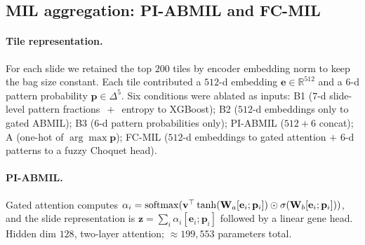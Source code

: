\subsection*{MIL aggregation: PI-ABMIL and FC-MIL}

\paragraph{Tile representation.}
For each slide we retained the top $200$ tiles by encoder
embedding norm to keep the bag size constant.
Each tile contributed a $512$-d \ctranspath{} embedding
$\mathbf{e}\in\mathbb{R}^{512}$ and a $6$-d pattern probability
$\mathbf{p}\in\Delta^5$.
Six conditions were ablated as inputs:
B1 ($7$-d slide-level pattern fractions $\,+\,$ entropy
to XGBoost\cite{chen2016xgboost}); B2 ($512$-d embeddings only to
gated ABMIL\cite{ilse2018attention}); B3 ($6$-d pattern
probabilities only); PI-ABMIL ($512+6$ concat); A (one-hot of
$\arg\max\mathbf{p}$); FC-MIL ($512$-d embeddings to gated
attention $+$ $6$-d patterns to a fuzzy Choquet head).

\paragraph{PI-ABMIL.}
Gated attention\cite{ilse2018attention} computes
$\alpha_i = \operatorname{softmax}(\mathbf{v}^\top \tanh(\mathbf{W}_a
[\mathbf{e}_i;\mathbf{p}_i]) \odot \sigma(\mathbf{W}_b
[\mathbf{e}_i;\mathbf{p}_i]))$, and the slide representation is
$\mathbf{z} = \sum_i \alpha_i [\mathbf{e}_i;\mathbf{p}_i]$
followed by a linear gene head.
Hidden dim $128$, two-layer attention; $\approx 199{,}553$
parameters total.


